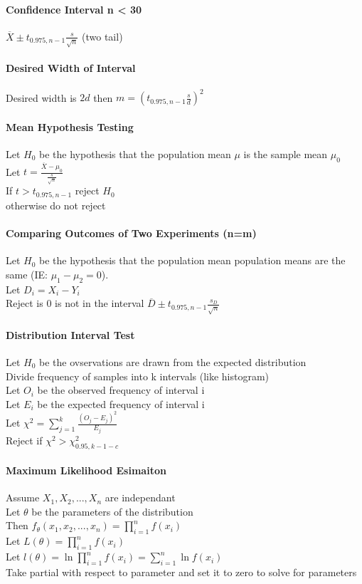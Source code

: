 \paragraph{Confidence Interval n < 30}
$\overline{X} \pm t_{0.975,n-1} \frac{s}{\sqrt{n}}$ (two tail)

\paragraph{Desired Width of Interval} Desired width is $2d$ then
$m =(t_{0.975,n-1} \frac{s}{d})^2$

\paragraph{Mean Hypothesis Testing}
Let $H_0$ be the hypothesis that the population mean $\mu$ is the sample mean
$\mu_0$ \\
Let $t = \frac{\overline{X} - \mu_0}{\frac{s}{\sqrt{n}}}$ \\
If $t > t_{0.975,n-1}$ reject $H_0$ \\
otherwise do not reject

\paragraph{Comparing Outcomes of Two Experiments (n=m)}
Let $H_0$ be the hypothesis that the population mean population means are the
same (IE: $\mu_1 - \mu_2 = 0$). \\
Let $D_i = X_i - Y_i$ \\
Reject is 0 is not in the interval
$\overline{D} \pm t_{0.975,n-1} \frac{s_D}{\sqrt{n}}$ \\


\paragraph{Distribution Interval Test}
Let $H_0$ be the ovservations are drawn from the expected distribution \\
Divide frequency of samples into k intervals (like histogram) \\
Let $O_i$ be the observed frequency of interval i \\
Let $E_i$ be the expected frequency of interval i \\
Let $\chi^2 = \sum_{j=1}^k \frac{(O_j - E_j)^2}{E_j}$ \\
Reject if $ \chi^2 > \chi_{0.95,k-1-c}^2 $

\paragraph{Maximum Likelihood Esimaiton}
Assume $X_1,X_2,...,X_n$ are independant \\
Let $\theta$ be the parameters of the distribution \\
Then $f_\theta(x_1,x_2,...,x_n) = \prod_{i=1}^n f(x_i)$ \\
Let $L(\theta) = \prod_{i=1}^n f(x_i)$ \\
Let $l(\theta) = \ln{\prod_{i=1}^n f(x_i)} = \sum_{i=1}^n \ln f(x_i)$ \\
Take partial with respect to parameter and set it to zero to solve for parameters
